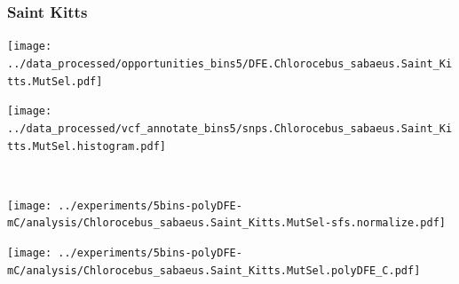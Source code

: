 \subsubsection{Saint Kitts}

\begin{minipage}{0.49\linewidth}
    \texttt{[image: ../data\_processed/opportunities\_bins5/DFE.Chlorocebus\_sabaeus.Saint\_Kitts.MutSel.pdf]}
\end{minipage}
\begin{minipage}{0.49\linewidth}
    \texttt{[image: ../data\_processed/vcf\_annotate\_bins5/snps.Chlorocebus\_sabaeus.Saint\_Kitts.MutSel.histogram.pdf]}
\end{minipage}
\\
\begin{minipage}{0.49\linewidth}
    \texttt{[image: ../experiments/5bins-polyDFE-mC/analysis/Chlorocebus\_sabaeus.Saint\_Kitts.MutSel-sfs.normalize.pdf]}
\end{minipage}
\begin{minipage}{0.4\linewidth}
    \texttt{[image: ../experiments/5bins-polyDFE-mC/analysis/Chlorocebus\_sabaeus.Saint\_Kitts.MutSel.polyDFE\_C.pdf]}
\end{minipage}
